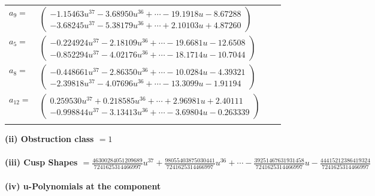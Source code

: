 \documentclass[1p]{elsarticle_modified}
\theoremstyle{definition}
\begin{document}
\begin{tabular}{m{7pt} m{180pt} m{7pt} m{180pt} }
\flushright $a_{9}=$&$\begin{pmatrix}-1.15463 u^{37}-3.68950 u^{36}+\cdots-19.1918 u-8.67288\\-3.68245 u^{37}-5.38179 u^{36}+\cdots+2.10103 u+4.87260\end{pmatrix}$ \\
\flushright $a_{5}=$&$\begin{pmatrix}-0.224924 u^{37}-2.18109 u^{36}+\cdots-19.6681 u-12.6508\\-0.852294 u^{37}-4.02176 u^{36}+\cdots-18.1714 u-10.7044\end{pmatrix}$ \\
\flushright $a_{8}=$&$\begin{pmatrix}-0.448661 u^{37}-2.86350 u^{36}+\cdots-10.0284 u-4.39321\\-2.39818 u^{37}-4.07696 u^{36}+\cdots-13.3099 u-1.91194\end{pmatrix}$ \\
\flushright $a_{12}=$&$\begin{pmatrix}0.259530 u^{37}+0.218585 u^{36}+\cdots+2.96981 u+2.40111\\-0.998844 u^{37}-3.13413 u^{36}+\cdots-3.69804 u-0.263339\end{pmatrix}$\\&\end{tabular}
\flushleft \textbf{(ii) Obstruction class $= 1$}\\~\\
\flushleft \textbf{(iii) Cusp Shapes $= \frac{46300284051209689}{7241625314466997} u^{37}+\frac{98055403875030441}{7241625314466997} u^{36}+\cdots-\frac{39251467631931458}{7241625314466997} u-\frac{44415212386419324}{7241625314466997}$}\\~\\
\newpage\renewcommand{\arraystretch}{1}
\flushleft \textbf{(iv) u-Polynomials at the component}\newline \\
\end{document}
